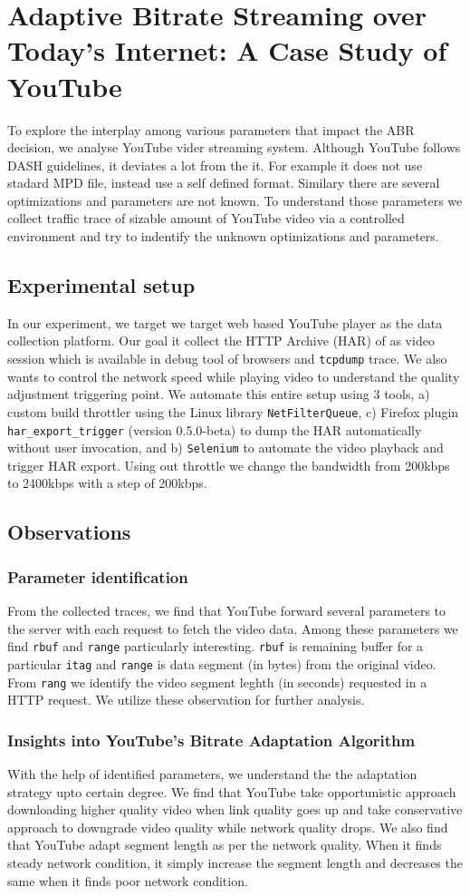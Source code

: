 \section{Adaptive Bitrate Streaming over Today’s Internet: A Case Study of YouTube}
To explore the interplay among various parameters that impact the ABR decision, we analyse YouTube vider streaming system. Although YouTube follows DASH guidelines, it deviates a lot from the it. For example it does not use stadard MPD file, instead use a self defined format. Similary there are several optimizations and parameters are not known. To understand those parameters we collect traffic trace of sizable amount of YouTube video via a controlled environment and try to indentify the unknown optimizations and parameters.
\subsection{Experimental setup}
In our experiment, we target we target web based YouTube player as the data collection platform. Our goal it collect the HTTP Archive (HAR) of as video session which is available in debug tool of browsers and {\tt tcpdump} trace. We also wants to control the network speed while playing video to understand the quality adjustment triggering point. We automate this entire setup using 3 tools, a) custom build throttler using the Linux library {\tt NetFilterQueue}, c) Firefox plugin {\tt har\_export\_trigger} (version 0.5.0-beta) to dump the HAR automatically without user invocation, and b) {\tt Selenium} to automate the video playback and trigger HAR export. Using out throttle we change the bandwidth from 200kbps to 2400kbps with a step of 200kbps.
\subsection{Observations}
\subsubsection{Parameter identification}
From the collected traces, we find that YouTube forward several parameters to the server with each request to fetch the video data. Among these parameters we find {\tt rbuf} and {\tt range} particularly interesting. {\tt rbuf} is remaining buffer for a particular {\tt itag} and {\tt range} is data segment (in bytes) from the original video. From {\tt rang}  we identify the video segment leghth (in seconds) requested in a HTTP request. We utilize these observation for further analysis.
\subsubsection{Insights into YouTube’s Bitrate Adaptation Algorithm}
With the help of identified parameters, we understand the the adaptation strategy upto certain degree. We find that YouTube take opportunistic approach downloading higher quality video when link quality goes up and take conservative approach to downgrade video quality while network quality drops. We also find that YouTube adapt segment length as per the network quality. When it finds steady network condition, it simply increase the segment length and decreases the same when it finds poor network condition.

